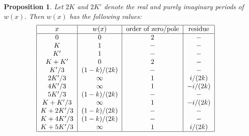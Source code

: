 \documentclass[12pt,reqno]{amsart}
\newtheorem{proposition}{Proposition}
\theoremstyle{remark}
\begin{document}
\begin{proposition}\label{proposition on values of w(x)}
Let $2K$ and $2K'$ denote the real and purely imaginary periods of~$w(x)$.
Then $w(x)$ has the following values:
\begin{equation*}
    \begin{tabular}{|c|c|c|c|p{6 in}|}
        \hline
        $x$ &  $w(x)$ & order of zero/pole &  residue\\
        \hline
        $0$ & $0$ & $2$&  $-$\\
        $K$ & $1$ &   $-$& $-$\\
        $K'$ & $1$ &  $-$ & $-$\\
        $K+K'$ & $0$ &  $2$ & $-$\\
        $K'/3$ & $(1-k)/(2k)$ & $-$ & $-$\\
        $2K'/3$ & $\infty$ &  $1$ & $i/(2k)$\\
        $4K'/3$ & $\infty$ & $1$ & $-i/(2k)$\\
        $5K'/3$ & $(1-k)/(2k)$ &  $-$ & $-$\\
        $K+K'/3$ & $\infty$ & $1$ & $-i/(2k)$\\
        $K+2K'/3$ & $(1-k)/(2k)$ &  $-$ & $-$\\
        $K+4K'/3$ & $(1-k)/(2k)$ & $-$ & $-$\\
        $K+5K'/3$ & $\infty$ &  $1$ & $i/(2k)$\\
        \hline
    \end{tabular}
\end{equation*}
\end{proposition}
\end{document}
